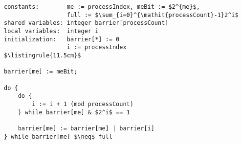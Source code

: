 \begin{minipage}
\centering
\begin{lstlisting}[mathescape, linewidth=11.5cm]
constants:        me := processIndex, meBit := $2^{me}$,
                  full := $\sum_{i=0}^{\mathit{processCount}-1}2^i$
shared variables: integer barrier[processCount]
local variables:  integer i
initialization:   barrier[*] := 0
                  i := processIndex
$\listingrule{11.5cm}$

barrier[me] := meBit;

do {
	do {
		i := i + 1 (mod processCount)
	} while barrier[me] & $2^i$ == 1

	barrier[me] := barrier[me] | barrier[i]
} while barrier[me] $\neq$ full
\end{lstlisting}
\end{minipage}
